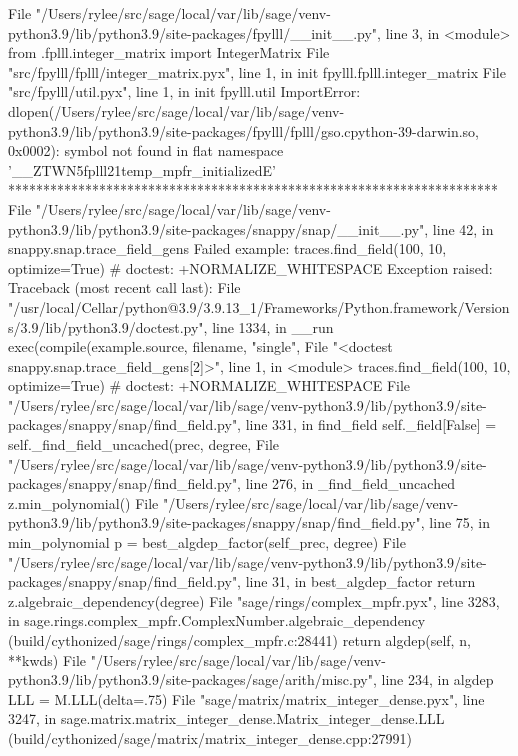       File "/Users/rylee/src/sage/local/var/lib/sage/venv-python3.9/lib/python3.9/site-packages/fpylll/__init__.py", line 3, in <module>
        from .fplll.integer_matrix import IntegerMatrix
      File "src/fpylll/fplll/integer_matrix.pyx", line 1, in init fpylll.fplll.integer_matrix
      File "src/fpylll/util.pyx", line 1, in init fpylll.util
    ImportError: dlopen(/Users/rylee/src/sage/local/var/lib/sage/venv-python3.9/lib/python3.9/site-packages/fpylll/fplll/gso.cpython-39-darwin.so, 0x0002): symbol not found in flat namespace '__ZTWN5fplll21temp_mpfr_initializedE'
**********************************************************************
File "/Users/rylee/src/sage/local/var/lib/sage/venv-python3.9/lib/python3.9/site-packages/snappy/snap/__init__.py", line 42, in snappy.snap.trace_field_gens
Failed example:
    traces.find_field(100, 10, optimize=True)    # doctest: +NORMALIZE_WHITESPACE
Exception raised:
    Traceback (most recent call last):
      File "/usr/local/Cellar/python@3.9/3.9.13_1/Frameworks/Python.framework/Versions/3.9/lib/python3.9/doctest.py", line 1334, in __run
        exec(compile(example.source, filename, "single",
      File "<doctest snappy.snap.trace_field_gens[2]>", line 1, in <module>
        traces.find_field(100, 10, optimize=True)    # doctest: +NORMALIZE_WHITESPACE
      File "/Users/rylee/src/sage/local/var/lib/sage/venv-python3.9/lib/python3.9/site-packages/snappy/snap/find_field.py", line 331, in find_field
        self._field[False] = self._find_field_uncached(prec, degree,
      File "/Users/rylee/src/sage/local/var/lib/sage/venv-python3.9/lib/python3.9/site-packages/snappy/snap/find_field.py", line 276, in _find_field_uncached
        z.min_polynomial()
      File "/Users/rylee/src/sage/local/var/lib/sage/venv-python3.9/lib/python3.9/site-packages/snappy/snap/find_field.py", line 75, in min_polynomial
        p = best_algdep_factor(self_prec, degree)
      File "/Users/rylee/src/sage/local/var/lib/sage/venv-python3.9/lib/python3.9/site-packages/snappy/snap/find_field.py", line 31, in best_algdep_factor
        return z.algebraic_dependency(degree)
      File "sage/rings/complex_mpfr.pyx", line 3283, in sage.rings.complex_mpfr.ComplexNumber.algebraic_dependency (build/cythonized/sage/rings/complex_mpfr.c:28441)
        return algdep(self, n, **kwds)
      File "/Users/rylee/src/sage/local/var/lib/sage/venv-python3.9/lib/python3.9/site-packages/sage/arith/misc.py", line 234, in algdep
        LLL = M.LLL(delta=.75)
      File "sage/matrix/matrix_integer_dense.pyx", line 3247, in sage.matrix.matrix_integer_dense.Matrix_integer_dense.LLL (build/cythonized/sage/matrix/matrix_integer_dense.cpp:27991)
